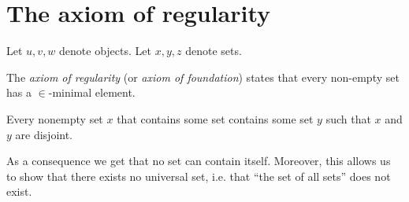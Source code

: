 \documentclass[../../set-theory.tex]{subfiles}
\begin{document}
  \section{The axiom of regularity}

  \begin{forthel}
  \end{forthel}

  \begin{forthel}
    Let $u,v,w$ denote objects.
    Let $x,y,z$ denote sets.
  \end{forthel}

  \noindent The \textit{axiom of regularity} (or \textit{axiom of foundation})
  states that every non-empty set has a $\in$-minimal element.

  \begin{forthel}
    \begin{axiom}[Regularity]\label{SetTheory_01_03_283644}
      Every nonempty set $x$ that contains some set contains some set $y$ such that $x$ and $y$ are disjoint.
    \end{axiom}
  \end{forthel}

  \noindent As a consequence we get that no set can contain itself.
  Moreover, this allows us to show that there exists no universal set, i.e. that
  \enquote{the set of all sets} does not exist.
\end{document}
